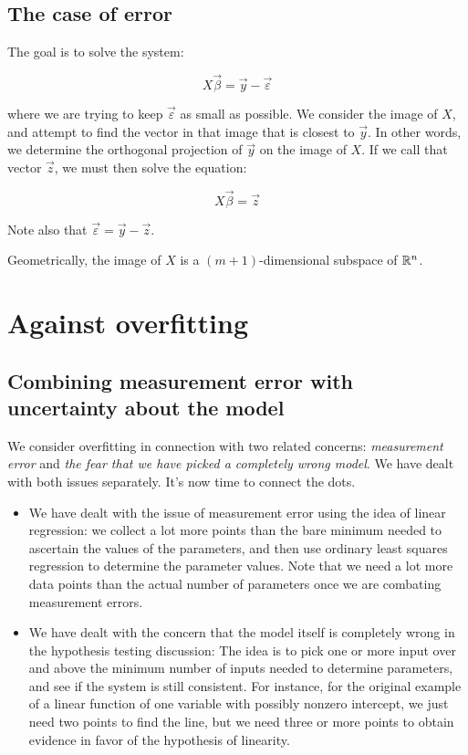 \documentclass[10pt]{amsart}
\begin{document}
\subsection{The case of error}

The goal is to solve the system:

$$X\vec{\beta} = \vec{y} - \vec{\varepsilon}$$

where we are trying to keep $\vec{\varepsilon}$ as small as possible. We
consider the image of $X$, and attempt to find the vector in that
image that is closest to $\vec{y}$. In other words, we determine the
orthogonal projection of $\vec{y}$ on the image of $X$. If we call
that vector $\vec{z}$, we must then solve the equation:

$$X\vec{\beta} = \vec{z}$$

Note also that $\vec{\varepsilon} = \vec{y} - \vec{z}$.

Geometrically, the image of $X$ is a $(m + 1)$-dimensional subspace of
$\mathbb{R}^n$.

\section{Against overfitting}

\subsection{Combining measurement error with uncertainty about the model}

We consider overfitting in connection with two related concerns: {\em
  measurement error} and {\em the fear that we have picked a
  completely wrong model}. We have dealt with both issues
separately. It's now time to connect the dots.

\begin{itemize}
\item We have dealt with the issue of measurement error using the idea
  of linear regression: we collect a lot more points than the bare
  minimum needed to ascertain the values of the parameters, and then
  use ordinary least squares regression to determine the parameter
  values. Note that we need a lot more data points than the actual
  number of parameters once we are combating measurement errors.
\item We have dealt with the concern that the model itself is
  completely wrong in the hypothesis testing discussion: The idea is
  to pick one or more input over and above the minimum number of
  inputs needed to determine parameters, and see if the system is
  still consistent. For instance, for the original example of a linear
  function of one variable with possibly nonzero intercept, we just
  need two points to find the line, but we need three or more points
  to obtain evidence in favor of the hypothesis of linearity.
\end{itemize}
\end{document}
